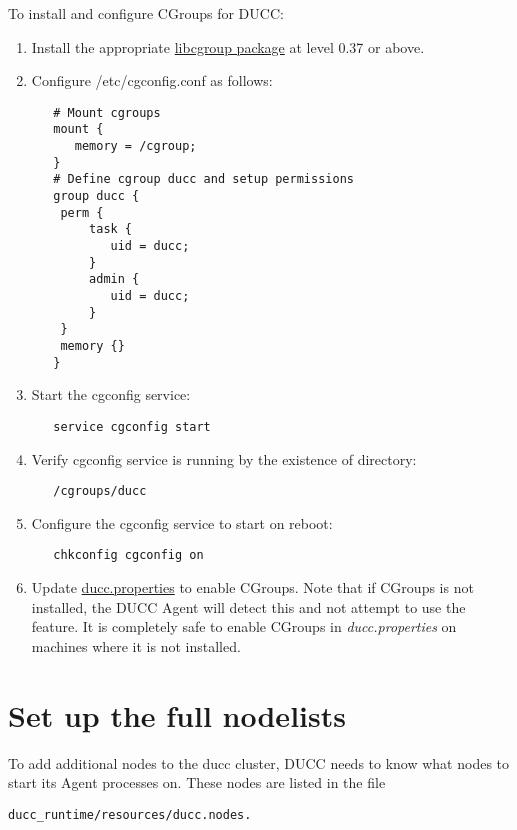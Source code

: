     To install and configure CGroups for DUCC:
    \begin{enumerate}
       \item Install the appropriate \hyperref[sec:install.prerequisites]{libcgroup package} at level 0.37
         or above.

       \item Configure /etc/cgconfig.conf as follows:
\begin{verbatim}
   # Mount cgroups
   mount {
      memory = /cgroup;
   }
   # Define cgroup ducc and setup permissions
   group ducc {
    perm {
        task {
           uid = ducc;
        }
        admin {
           uid = ducc;
        }
    }
    memory {}
   }
\end{verbatim}
       \item Start the cgconfig service:
\begin{verbatim}
   service cgconfig start
\end{verbatim}
         
       \item Verify cgconfig service is running by the existence of directory: 
\begin{verbatim}
   /cgroups/ducc
\end{verbatim}
         
       \item Configure the cgconfig service to start on reboot:
\begin{verbatim}
   chkconfig cgconfig on
\end{verbatim}

       \item Update \hyperref[itm:props-agent.cgroups.enable]{ducc.properties} to enable CGroups.
         Note that if CGroups is not installed, the DUCC Agent will detect this and not attempt to
         use the feature.  It is completely safe to enable CGroups in {\em ducc.properties} on
         machines where it is not installed.
    \end{enumerate}

\section{Set up the full nodelists}
   To add additional nodes to the ducc cluster, DUCC needs to know what nodes to start its Agent
   processes on.  These nodes are listed in the file
\begin{verbatim}
ducc_runtime/resources/ducc.nodes.  
\end{verbatim}
   
